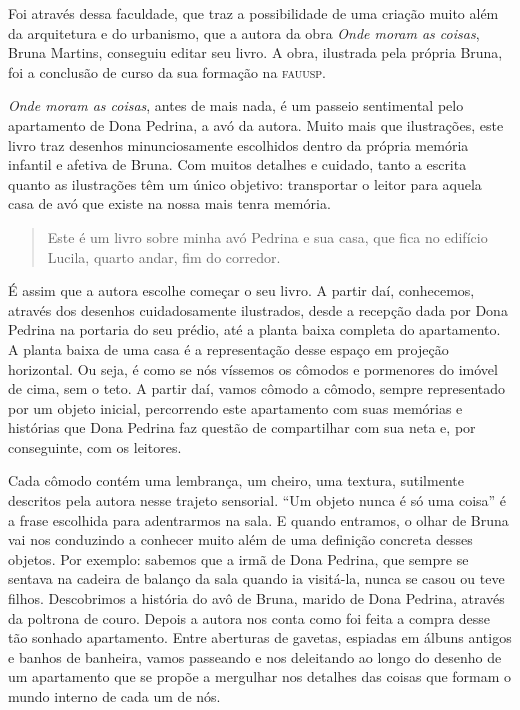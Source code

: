 \documentclass[11pt]{extarticle}
\begin{document}
Foi através dessa faculdade, que traz a possibilidade de uma criação muito além da arquitetura e do urbanismo, que a autora da obra \textit{Onde moram as coisas}, Bruna Martins, conseguiu editar seu livro. A obra, ilustrada pela própria Bruna, foi a conclusão de curso da sua formação na \textsc{fauusp}. 

\textit{Onde moram as coisas}, antes de mais nada, é um passeio sentimental pelo apartamento de Dona Pedrina, a avó da autora. Muito mais que ilustrações, este livro traz desenhos minunciosamente escolhidos dentro da própria memória infantil e afetiva de Bruna. Com muitos detalhes e cuidado, tanto a escrita quanto as ilustrações têm um único objetivo: transportar o leitor para aquela casa de avó que existe na nossa mais tenra memória. 


\begin{quote}

Este é um livro sobre minha avó Pedrina e sua casa, que fica no edifício Lucila, quarto andar, fim do corredor.

\end{quote}

É assim que a autora escolhe começar o seu livro. A partir daí, conhecemos, através dos desenhos cuidadosamente ilustrados, desde a recepção dada por Dona Pedrina na portaria do seu prédio, até a planta baixa completa do apartamento. A planta baixa de uma casa é a representação desse espaço em projeção horizontal. Ou seja, é como se nós víssemos os cômodos e pormenores do imóvel de cima, sem o teto. A partir daí, vamos cômodo a cômodo, sempre representado por um objeto inicial, percorrendo este apartamento com suas memórias e histórias que Dona Pedrina faz questão de compartilhar com sua neta e, por conseguinte, com os leitores.

Cada cômodo contém uma lembrança, um cheiro, uma textura, sutilmente descritos pela autora nesse trajeto sensorial. ``Um objeto nunca é só uma coisa” é a frase escolhida para adentrarmos na sala. E quando entramos, o olhar de Bruna vai nos conduzindo a conhecer muito além de uma definição concreta desses objetos. Por exemplo: sabemos que a irmã de Dona Pedrina, que sempre se sentava na cadeira de balanço da sala quando ia visitá-la, nunca se casou ou teve filhos. Descobrimos a história do avô de Bruna, marido de Dona Pedrina, através da poltrona de couro. Depois a autora nos conta como foi feita a compra desse tão sonhado apartamento. Entre aberturas de gavetas, espiadas em álbuns antigos e banhos de banheira, vamos passeando e nos deleitando ao longo do desenho de um apartamento que se propõe a mergulhar nos detalhes das coisas que formam o mundo interno de cada um de nós. 
\end{document}
